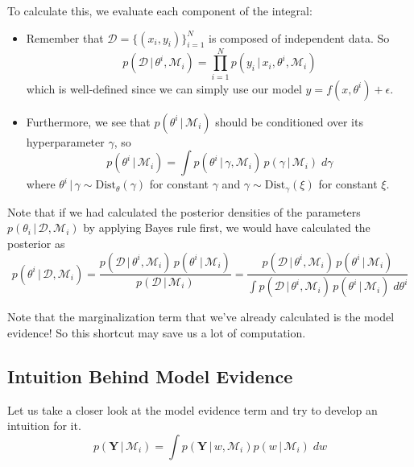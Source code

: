 \documentclass{article}
\begin{document}
    To calculate this, we evaluate each component of the integral:
    \begin{itemize}
      \item Remember that $\mathcal{D} = \{(x_i, y_i)\}_{i=1}^N$ is composed of independent data. So
      \begin{equation}
        p(\mathcal{D}\,|\,\theta^i, \mathcal{M}_i) = \prod_{i=1}^N p(y_i \,|\, x_i, \theta^i, \mathcal{M}_i)
      \end{equation}
      which is well-defined since we can simply use our model $y = f (x, \theta^i) + \epsilon$.

      \item Furthermore, we see that $p(\theta^i \,|\,\mathcal{M}_i)$ should be conditioned over its hyperparameter $\gamma$, so
      \begin{equation}
        p(\theta^i \,|\,\mathcal{M}_i) = \int p(\theta^i \,|\,\gamma, \mathcal{M}_i) \, p(\gamma\,|\,\mathcal{M}_i)\; d\gamma
      \end{equation}
      where $\theta^i \,|\,\gamma \sim \text{Dist}_\theta (\gamma)$ for constant $\gamma$ and $\gamma \sim \text{Dist}_\gamma (\xi)$ for constant $\xi$.
    \end{itemize}

    Note that if we had calculated the posterior densities of the parameters $p(\theta_i\,|\,\mathcal{D}, \mathcal{M}_i)$ by applying Bayes rule first, we would have calculated the posterior as
    \begin{equation}
      p(\theta^i\,|\,\mathcal{D}, \mathcal{M}_i) = \frac{p(\mathcal{D}\,|\,\theta^i, \mathcal{M}_i)\, p(\theta^i \,|\,\mathcal{M}_i)}{p(\mathcal{D}\,|\,\mathcal{M}_i)} = \frac{p(\mathcal{D}\,|\,\theta^i, \mathcal{M}_i)\, p(\theta^i \,|\,\mathcal{M}_i)}{\int p(\mathcal{D}\,|\,\theta^i, \mathcal{M}_i)\, p(\theta^i \,|\,\mathcal{M}_i)\; d\theta^i}
    \end{equation}

    Note that the marginalization term that we've already calculated is the model evidence! So this shortcut may save us a lot of computation.

  \subsection{Intuition Behind Model Evidence}

    Let us take a closer look at the model evidence term and try to develop an intuition for it.
    \begin{equation}
      p(\mathbf{Y} \,|\,\mathcal{M}_i) = \int p(\mathbf{Y}\,|\,w, \mathcal{M}_i) p(w\,|\,\mathcal{M}_i) \; dw
    \end{equation}
\end{document}
